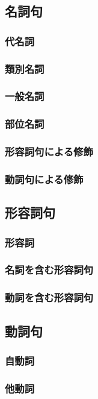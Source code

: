 \subsection{名詞句}
\subsubsection{代名詞}
\subsubsection{類別名詞}
\subsubsection{一般名詞}
\subsubsection{部位名詞}
\subsubsection{形容詞句による修飾}
\subsubsection{動詞句による修飾}
\subsection{形容詞句}
\subsubsection{形容詞}
\subsubsection{名詞を含む形容詞句}
\subsubsection{動詞を含む形容詞句}
\subsection{動詞句}
\subsubsection{自動詞}
\subsubsection{他動詞}
